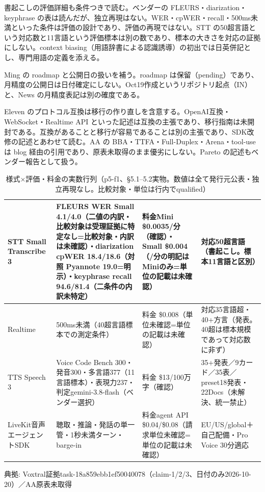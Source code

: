 \documentclass[lualatex,a4paper,10pt]{jlreq}
\begin{document}
書起こしの評価詳細も条件つきで読む。ベンダーの FLEURS・diarization・keyphrase の表は読んだが、独立再現はない。WER・cpWER・recall・500ms未満といった条件は評価の設計であり、評価の再現ではない。STT の50超言語という対応数と11言語という評価標本は別の数であり、標本の大きさを対応の証拠にしない。context biasing（用語辞書による認識誘導）の初出では日英併記とし、専門用語の定義を添える。


Ming の roadmap と公開日の扱いを補う。roadmap は保留（pending）であり、月精度の公開日は日付確定にしない。Oct19作成というリポジトリ起点（IN）と、News の月精度表記は別の確度である。


Eleven のプロトコル互換は移行の作り直しを含意する。OpenAI互換・WebSocket・Realtime API といった記述は互換の主張であり、移行指南は未開封である。互換があることと移行が容易であることは別の主張であり、SDK改修の記述とあわせて読む。AA の BBA・TTFA・Full-Duplex・Arena・tool-use は blog 経由の引用であり、原表未取得のまま優劣にしない。Pareto の記述もベンダー報告として扱う。


\begin{table}[htbp]\centering\footnotesize
\caption{様式×評価・料金の実数行列（p5-f1、§5.1–5.2実物。数値は全て発行元公表・独立再現なし。比較対象・単位は行内でqualified）}
\begin{tabularx}{0.96\linewidth}{@{}lXXX@{}}
\toprule
STT Small Transcribe 3 & FLEURS WER Small 4.1/4.0（二値の内訳・比較対象は受理証拠に特定なし=比較対象・内訳は未確認）・diarization cpWER 18.4/18.6（対照 Pyannote 19.0=明示）・keyphrase recall 94.6/81.4（二条件の内訳未特定） & 料金Mini \$0.0035/分（確認）・Small \$0.004（/分の明記はMiniのみ=単位の記載は未確認） & 対応50超言語（書起こし。標本11言語と区別） \\
\midrule
Realtime & 500ms未満（40超言語標本での測定条件） & 料金 \$0.008（単位未確認=単位の記載は未確認） & 対応35言語超・40+方言（発表。40超は標本規模であって対応数に非ず） \\
TTS Speech 3 & Voice Code Bench 300・発音300・多言語377（11言語標本）・表現力237・判定gemini-3.8-flash（ベンダー選択） & 料金 \$13/100万字（確認） & 35+発表／9カード／35表／preset18発表・22Docs（未解決、統一禁止） \\
LiveKit音声エージェントSDK & 聴取・推論・発話の単一管・1秒未満ターン・barge-in & 料金agent API \$0.04/\$0.08（請求単位未確認=単位の記載は未確認） & EU/US/global＋自己配備・Pro Voice 30分適応 \\
\bottomrule
\end{tabularx}
{\scriptsize\color{SurveyMuted} 典拠: Voxtral証拠task-18a859ebb1ef50040078（claim-1/2/3、日付のみ2026-10-20）／AA原表未取得\par}
\end{table}
\end{document}

